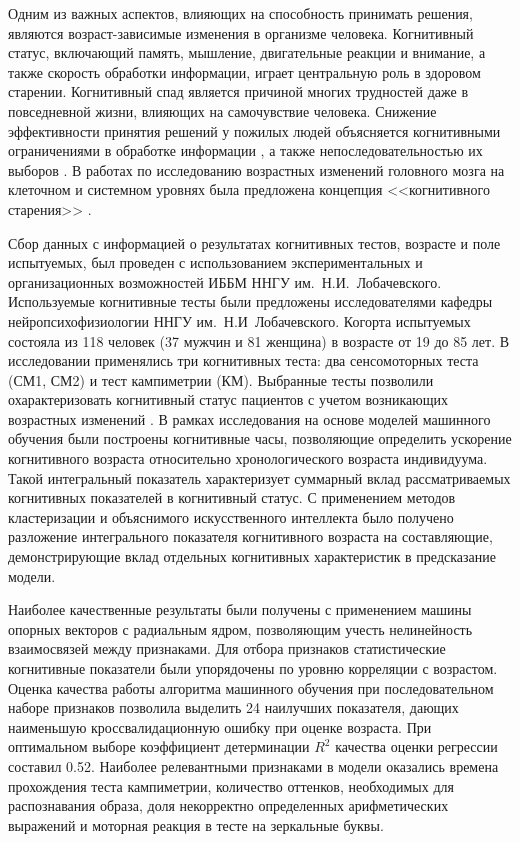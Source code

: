 Одним из важных аспектов, влияющих на способность принимать решения, являются возраст-зависимые изменения в организме человека. Когнитивный статус, включающий память, мышление, двигательные реакции и внимание, а также скорость обработки информации, играет центральную роль в здоровом старении. Когнитивный спад является причиной многих трудностей даже в повседневной жизни, влияющих на самочувствие человека. Снижение эффективности принятия решений у пожилых людей объясняется когнитивными ограничениями в обработке информации \cite{frey_role_2015}, а также непоследовательностью их выборов \cite{finucane_task_2005}. В работах по исследованию возрастных изменений головного мозга на клеточном и системном уровнях была предложена концепция <<когнитивного старения>> \cite{blazer_cognitive_2017}.

Сбор данных с информацией о результатах когнитивных тестов, возрасте и поле испытуемых, был проведен с использованием экспериментальных и организационных возможностей ИББМ ННГУ им.~Н.И.~Лобачевского. Используемые когнитивные тесты были предложены исследователями кафедры нейропсихофизиологии ННГУ им.~Н.И~Лобачевского. Когорта испытуемых состояла из 118 человек (37 мужчин и 81 женщина) в возрасте от 19 до 85 лет. В исследовании применялись три когнитивных теста: два сенсомоторных теста (СМ1, СМ2) и тест кампиметрии (КМ). Выбранные тесты позволили охарактеризовать когнитивный статус пациентов с учетом возникающих возрастных изменений \cite{polevaya_eventrelated_2019}. В рамках исследования на основе моделей машинного обучения были построены когнитивные часы, позволяющие определить ускорение когнитивного возраста относительно хронологического возраста индивидуума. Такой интегральный показатель характеризует суммарный вклад рассматриваемых когнитивных показателей в когнитивный статус. С применением методов кластеризации и объяснимого искусственного интеллекта было получено разложение интегрального показателя когнитивного возраста на составляющие, демонстрирующие вклад отдельных когнитивных характеристик в предсказание модели. 


Наиболее качественные результаты были получены с применением машины опорных векторов с радиальным ядром, позволяющим учесть нелинейность взаимосвязей между признаками. Для отбора признаков статистические когнитивные показатели были упорядочены по уровню корреляции с возрастом. Оценка качества работы алгоритма машинного обучения при последовательном наборе признаков позволила выделить 24 наилучших показателя, дающих наименьшую кроссвалидационную ошибку при оценке возраста. При оптимальном выборе коэффициент детерминации $R^2$ качества оценки регрессии составил 0.52. Наиболее релевантными признаками в модели оказались времена прохождения теста кампиметрии, количество оттенков, необходимых для распознавания образа, доля некорректно определенных арифметических выражений и моторная реакция в тесте на зеркальные буквы. 

